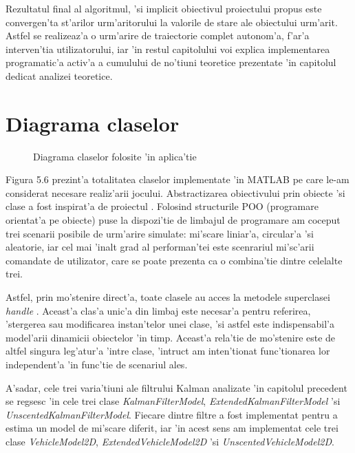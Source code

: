 \documentclass[12pt,a4paper,twoside]{report}
\begin{document}
\vspace{5px}

Rezultatul final al algoritmul, 'si implicit obiectivul proiectului propus este convergen'ta st'arilor urm'aritorului la valorile de stare ale obiectului urm'arit. Astfel se realizeaz'a o urm'arire de traiectorie complet autonom'a, f'ar'a interven'tia utilizatorului, iar 'in restul capitolului voi explica implementarea programatic'a activ'a a cumulului de no'tiuni teoretice prezentate 'in capitolul dedicat analizei teoretice.

\section{Diagrama claselor}

\begin{figure}[H]
\hspace*{-1cm}
 
 \caption{Diagrama claselor folosite 'in aplica'tie}
\end{figure}


Figura 5.6 prezint'a totalitatea claselor implementate 'in MATLAB pe care le-am considerat necesare realiz'arii jocului. Abstractizarea obiectivului prin obiecte 'si clase a fost inspirat'a de proiectul \cite{AKSF}. Folosind structurile POO (programare orientat'a pe obiecte) puse la dispozi'tie de limbajul de programare am coceput trei scenarii posibile de urm'arire simulate: mi'scare liniar'a, circular'a 'si aleatorie, iar cel mai 'inalt grad al performan'tei este scenrariul mi'sc'arii comandate de utilizator, care se poate prezenta ca o combina'tie dintre celelalte trei.

\vspace{5px}

Astfel, prin mo'stenire direct'a, toate clasele au acces la metodele superclasei \textit{handle} \cite{handle}. Aceast'a clas'a unic'a din limbaj este necesar'a pentru referirea, 'stergerea sau modificarea instan'telor unei clase, 'si astfel este indispensabil'a model'arii dinamicii obiectelor 'in timp. Aceast'a rela'tie de mo'stenire este de altfel singura leg'atur'a 'intre clase, 'intruc\ia t am inten'tionat func'tionarea lor independent'a 'in func'tie de scenariul ales.

\vspace{5px}

A'sadar, cele trei varia'tiuni ale filtrului Kalman analizate 'in capitolul precedent se reg\ia sesc 'in cele trei clase \textit{KalmanFilterModel}, \textit{ExtendedKalmanFilterModel} 'si \textit{UnscentedKalmanFilterModel}. Fiecare dintre filtre a fost implementat pentru a estima un model de mi'scare diferit, iar 'in acest sens am implementat cele trei clase \textit{VehicleModel2D}, \textit{ExtendedVehicleModel2D} 'si \textit{UnscentedVehicleModel2D}. 
\end{document}
